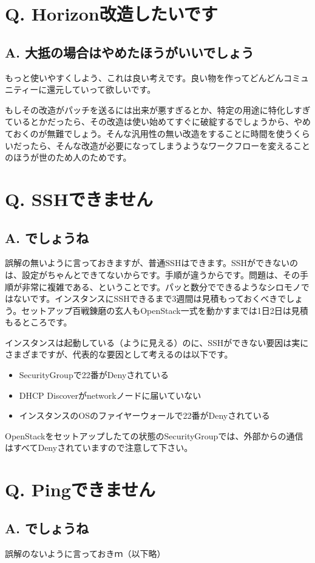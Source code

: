 \documentclass[9pt,b5paper,tombo,openany]{jsbook}
\begin{document}
\section*{Q. Horizon改造したいです}
\subsection*{A. 大抵の場合はやめたほうがいいでしょう}
もっと使いやすくしよう、これは良い考えです。良い物を作ってどんどんコミュニティーに還元していって欲しいです。

もしその改造がパッチを送るには出来が悪すぎるとか、特定の用途に特化しすぎているとかだったら、その改造は使い始めてすぐに破綻するでしょうから、やめておくのが無難でしょう。そんな汎用性の無い改造をすることに時間を使うくらいだったら、そんな改造が必要になってしまうようなワークフローを変えることのほうが世のため人のためです。

\section*{Q. SSHできません}
\subsection*{A. でしょうね}
誤解の無いように言っておきますが、普通SSHはできます。SSHができないのは、設定がちゃんとできてないからです。手順が違うからです。問題は、その手順が非常に複雑である、ということです。パッと数分でできるようなシロモノではないです。インスタンスにSSHできるまで3週間は見積もっておくべきでしょう。セットアップ百戦錬磨の玄人もOpenStack一式を動かすまでは1日2日は見積もるところです。

インスタンスは起動している（ように見える）のに、SSHができない要因は実にさまざまですが、代表的な要因として考えるのは以下です。
\begin{itemize}
	\item SecurityGroupで22番がDenyされている
	\item DHCP Discoverがnetworkノードに届いていない
	\item インスタンスのOSのファイヤーウォールで22番がDenyされている
\end{itemize}
OpenStackをセットアップしたての状態のSecurityGroupでは、外部からの通信はすべてDenyされていますので注意して下さい。

\section*{Q. Pingできません}
\subsection*{A. でしょうね}
誤解のないように言っておきｍ（以下略）
\end{document}
